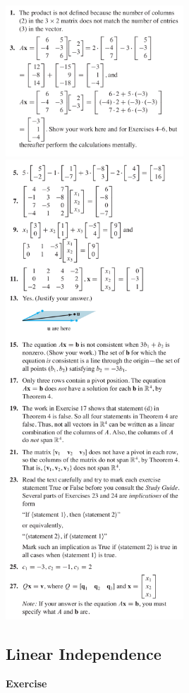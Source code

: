 \documentclass[a4paper,11pt,reqno]{amsart}
\numberwithin{equation}{section}
\begin{document}
\includegraphics[width=0.5\textwidth]{exercises/me_ans1.png}
\includegraphics[width=0.5\textwidth]{exercises/me_ans2.png}

\newpage

\subsection{Linear Independence}
\textbf{Exercise}
\end{document}
